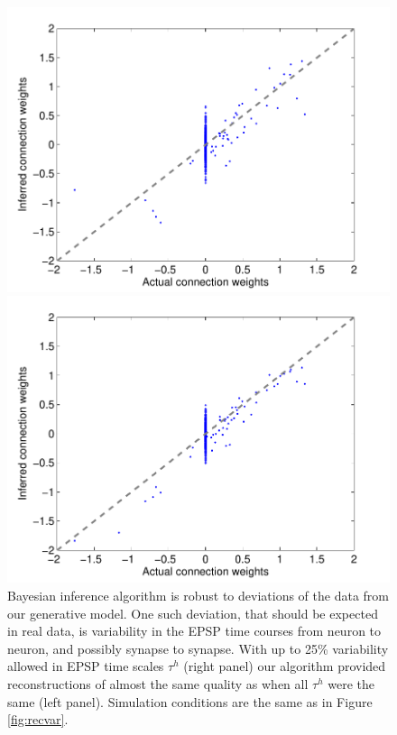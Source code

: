 \begin{figure}[h]
\label{fig:rasters}
\end{figure}

\begin{figure}[h]
\centering
\begin{minipage}[c]{0.45\hsize}
\includegraphics[width=\hsize]{../figs/FigureA9_all_same_sol}
\end{minipage}
\begin{minipage}[c]{0.45\hsize}
\includegraphics[width=\hsize]{../figs/FigureA9_variable_25}
\end{minipage}
\caption{Bayesian inference algorithm is robust to deviations of the
data from our generative model. One such deviation, that should be expected in real data, is variability in the EPSP time courses from neuron to neuron, and possibly synapse to synapse.
With up to 25\% variability allowed in EPSP time scales $\tau^h$ (right panel) our algorithm provided reconstructions of almost the same quality as when all $\tau^h$ were the same (left panel). Simulation conditions are the same as in Figure \ref{fig:recvar}.}
\label{fig:vartau}
\end{figure}


